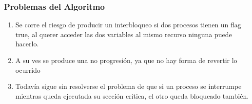 \documentclass{beamer}
\begin{document}
\begin{frame}

\frametitle{Problemas del Algoritmo}
\begin{enumerate}[$*$]
\item Se corre el riesgo de producir un interbloqueo si dos procesos tienen un flag true, al querer 
acceder las dos variables al mismo recurso ninguna puede hacerlo.
\item A su ves se produce una no progresión, ya que no hay forma de revertir lo ocurrido
\item Todavía sigue sin resolverse el problema de que si un proceso se interrumpe mientras queda 
ejecutada su sección crítica, el otro queda bloqueado también.
\end{enumerate}

\end{frame}
\end{document}
